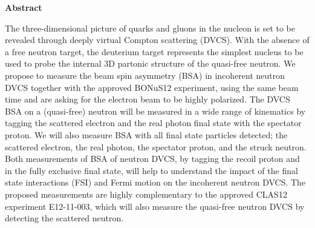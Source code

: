 \setcounter{page}{5}

     \begin{center}
{\large\textbf{Abstract}}
    \end{center}
\vspace*{0.4cm}

The three-dimensional picture of quarks and gluons in the nucleon is set to be 
revealed through deeply virtual Compton scattering (DVCS). With the absence of 
a free neutron target, the deuterium target represents the simplest nucleus to 
be used to probe the internal 3D partonic structure of the quasi-free neutron.  
We propose to measure the beam spin asymmetry (BSA) in incoherent neutron DVCS 
together with the approved BONuS12 experiment, using the same beam time and are 
asking for the electron beam to be highly polarized. The DVCS BSA on a 
(quasi-free) neutron will be measured in a wide range of kinematics by tagging 
the scattered electron and the real photon final state with the spectator 
proton. We will also measure BSA with all final state particles detected; the 
scattered electron, the real photon, the spectator proton, and the struck 
neutron. Both measurements of BSA of neutron DVCS, by tagging the recoil proton 
and in the fully exclusive final state, will help to understand the impact of 
the final state interactions (FSI) and Fermi motion on the incoherent neutron 
DVCS. The proposed measurements are highly complementary to the approved CLAS12 
experiment E12-11-003, which will also measure the quasi-free neutron DVCS by 
detecting the scattered neutron.

\newpage

